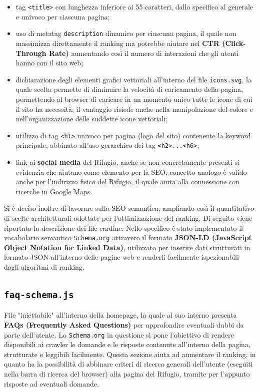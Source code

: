 \documentclass[a4paper,10pt]{article}
\begin{document}
\begin{itemize}
		\item tag \texttt{<title>} con lunghezza inferiore ai 55 caratteri, dallo specifico al generale e univoco per ciascuna pagina;
		\item uso di metatag \texttt{description} dinamico per ciascuna pagina, il quale non massimizza direttamente il ranking ma potrebbe aiutare nel \textbf{CTR (Click-Through Rate)} aumentando così il numero di interazioni che gli utenti hanno con il sito web;
		\item dichiarazione degli elementi grafici vettoriali all'interno del file \texttt{icons.svg}, la quale scelta permette di diminuire la velocità di caricamento della pagina, permettendo al browser di caricare in un momento unico tutte le icone di cui il sito ha necessità; il vantaggio risiede anche nella manipolazione del colore e nell'organizzazione delle suddette icone vettoriali;
		\item utilizzo di tag \texttt{<h1>} univoco per pagina (logo del sito) contenente la keyword principale, abbinato all'uso gerarchico dei tag \texttt{<h2>...<h6>};
		\item link ai \textbf{social media} del Rifugio, anche se non concretamente presenti si evidenzia che aiutano come elemento per la SEO; concetto analogo è valido anche per l'indirizzo fisico del Rifugio, il quale aiuta alla connessione con ricerche in Google Maps.
	\end{itemize}
	Si è deciso inoltre di lavorare sulla SEO semantica, ampliando così il quantitativo di scelte architetturali adottate per l'ottimizzazione del ranking. Di seguito viene riportata la descrizione dei file cardine. Nello specifico è stato implementato il vocabolario semantico \texttt{Schema.org} attravero il formato \textbf{JSON-LD (JavaScript Object Notation for Linked Data)}, utilizzato per inserire dati strutturati in formato JSON all'interno delle pagine web e renderli facilmente ispezionabili dagli algoritmi di ranking.
	\subsection{\texttt{faq-schema.js}}
	File "iniettabile" all'interno della homepage, la quale al suo interno presenta \textbf{FAQs (Frequently Asked Questions)} per approfondire eventuali dubbi da parte dell'utente. Lo \texttt{Schema.org} in questione si pone l'obiettivo di rendere disponibili ai crawler le domande e le risposte contenute all'interno della pagina, strutturate e leggibili facilmente. Questa sezione aiuta ad aumentare il ranking, in quanto ha la possibilità di abbinare criteri di ricerca generali dell'utente (eseguiti nella barra di ricerca del browser) alla pagina del Rifugio, tramite per l'appunto risposte ad eventuali domande.
\end{document}
